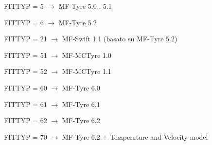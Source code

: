 \begin{itemize}
    {\tiny
    \setlength\itemsep{-0.5em}
    \item FITTYP = 5 \hspace{0.33cm} $\longrightarrow$ \hspace{0.2cm} MF-Tyre 5.0 , 5.1
    \item FITTYP = 6 \hspace{0.33cm} $\longrightarrow$ \hspace{0.2cm} MF-Tyre 5.2
    \item FITTYP = 21 \hspace{0.2cm} $\longrightarrow$ \hspace{0.2cm} 
    MF-Swift 1.1  (basato su MF-Tyre 5.2)
    \item FITTYP = 51 \hspace{0.2cm} $\longrightarrow$ \hspace{0.2cm} MF-MCTyre 1.0
    \item FITTYP = 52 \hspace{0.2cm} $\longrightarrow$ \hspace{0.2cm} MF-MCTyre 1.1
    \item FITTYP = 60 \hspace{0.2cm} $\longrightarrow$ \hspace{0.2cm} MF-Tyre 6.0
    \item FITTYP = 61 \hspace{0.2cm} $\longrightarrow$ \hspace{0.2cm} MF-Tyre 6.1
    \item FITTYP = 62 \hspace{0.2cm} $\longrightarrow$ \hspace{0.2cm} MF-Tyre 6.2
    \item FITTYP = 70 \hspace{0.2cm} $\longrightarrow$ \hspace{0.2cm} MF-Tyre 6.2 + Temperature and Velocity model

    }
\end{itemize}

